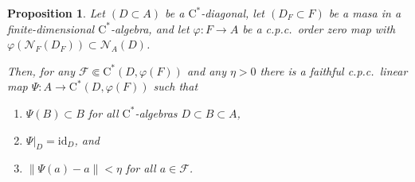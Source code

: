 \documentclass[11pt,a4paper]{amsart}
\newtheorem{proposition}[theorem]{Proposition}
\theoremstyle{definition}
\numberwithin{equation}{section}
\newcommand{\mc}[1]{\mathcal{#1}}
\begin{document}
\begin{proposition}\label{prop:cond-exps}
Let $(D\subset A)$ be a $\mathrm{C}^\ast$-diagonal, let $(D_F\subset F)$ be a masa in a finite-dimensional $\mathrm{C}^\ast$-algebra, and let $\varphi\colon F\to A$ be a c.p.c.\ order zero map with $\varphi(\mc{N}_F(D_F))\subset\mc{N}_A(D)$. 

Then, for any $\mathcal{F}\Subset\mathrm{C}^\ast(D,\varphi(F))$ and any $\eta>0$ there is a faithful c.p.c.\ linear map $\Psi\colon A\to \mathrm{C}^\ast(D,\varphi(F))$ such that 
\begin{enumerate}[label=\normalfont{(\roman*)}]
\item\label{item:condexp1} $\Psi(B)\subset B$ for all $\mathrm{C}^\ast$-algebras $D\subset B\subset A$,
\item\label{item:condexp2} $\Psi\vert_D=\mathrm{id}_D$, and
\item\label{item:condexp3} $\|\Psi(a)-a\|<\eta$ for all $a\in\mathcal{F}$.
\end{enumerate}

\end{proposition}
\end{document}
